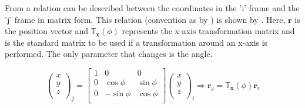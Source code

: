From  a relation can be described between the coordinates in the 'i' frame and the 'j' frame in matrix form. This relation (convention as by \cite{mooij2013stat}) is shown by . Here, $\mathbf{r}$ is the position vector and $\mathbb{T}_{\mathbf{x}}(\phi)$ represents the x-axis transformation matrix and is the standard matrix to be used if a transformation around an x-axis is performed. The only parameter that changes is the angle.








\begin{equation} \label{eq:xaxistransmatr}
\begin{pmatrix}
x\\
y\\
z\\
\end{pmatrix}_{j}=
\begin{bmatrix}
1 & 0 & 0 \\
0 & \cos\phi & \sin\phi \\
0 & -\sin\phi & \cos\phi \\
\end{bmatrix}
\begin{pmatrix}
x\\
y\\
z\\
\end{pmatrix}_{i}\Rightarrow
\mathbf{r}_{j}=\mathbb{T}_{\mathbf{x}}(\phi)\mathbf{r}_{i}
\end{equation}




